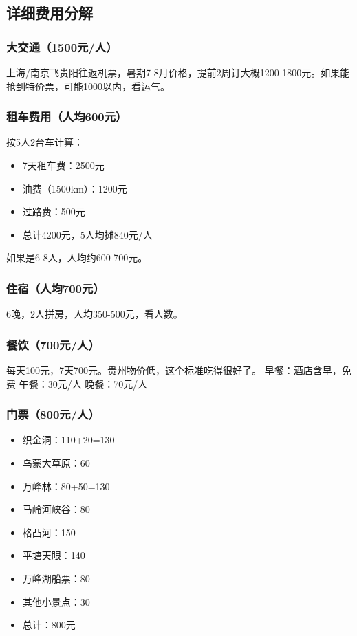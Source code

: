 \documentclass[12pt,a4paper,UTF8]{ctexart}
\begin{document}
\subsection{详细费用分解}

\subsubsection{大交通（1500元/人）}
上海/南京飞贵阳往返机票，暑期7-8月价格，提前2周订大概1200-1800元。如果能抢到特价票，可能1000以内，看运气。

\subsubsection{租车费用（人均600元）}
按5人2台车计算：
\begin{itemize}
\item 7天租车费：2500元
\item 油费（1500km）：1200元
\item 过路费：500元
\item 总计4200元，5人均摊840元/人
\end{itemize}

如果是6-8人，人均约600-700元。

\subsubsection{住宿（人均700元）}
6晚，2人拼房，人均350-500元，看人数。

\subsubsection{餐饮（700元/人）}
每天100元，7天700元。贵州物价低，这个标准吃得很好了。
早餐：酒店含早，免费
午餐：30元/人
晚餐：70元/人

\subsubsection{门票（800元/人）}
\begin{itemize}
\item 织金洞：110+20=130
\item 乌蒙大草原：60
\item 万峰林：80+50=130
\item 马岭河峡谷：80
\item 格凸河：150
\item 平塘天眼：140
\item 万峰湖船票：80
\item 其他小景点：30
\item 总计：800元
\end{itemize}
\end{document}
